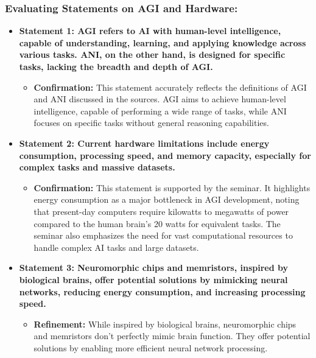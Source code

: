 \documentclass[
]{article}
\author{}
\date{}
\begin{document}
\subsubsection{Evaluating Statements on AGI and
Hardware:}\label{evaluating-statements-on-agi-and-hardware}

\begin{itemize}
\item
  \textbf{Statement 1: AGI refers to AI with human-level intelligence,
  capable of understanding, learning, and applying knowledge across
  various tasks. ANI, on the other hand, is designed for specific tasks,
  lacking the breadth and depth of AGI.}

  \begin{itemize}
  
  \item
    \textbf{Confirmation:} This statement accurately reflects the
    definitions of AGI and ANI discussed in the sources. AGI aims to
    achieve human-level intelligence, capable of performing a wide range
    of tasks, while ANI focuses on specific tasks without general
    reasoning capabilities.
  \end{itemize}
\item
  \textbf{Statement 2: Current hardware limitations include energy
  consumption, processing speed, and memory capacity, especially for
  complex tasks and massive datasets.}

  \begin{itemize}
  
  \item
    \textbf{Confirmation:} This statement is supported by the seminar.
    It highlights energy consumption as a major bottleneck in AGI
    development, noting that present-day computers require kilowatts to
    megawatts of power compared to the human brain's 20 watts for
    equivalent tasks. The seminar also emphasizes the need for vast
    computational resources to handle complex AI tasks and large
    datasets.
  \end{itemize}
\item
  \textbf{Statement 3: Neuromorphic chips and memristors, inspired by
  biological brains, offer potential solutions by mimicking neural
  networks, reducing energy consumption, and increasing processing
  speed.}

  \begin{itemize}
  
  \item
    \textbf{Refinement:} While inspired by biological brains,
    neuromorphic chips and memristors don't perfectly mimic brain
    function. They offer potential solutions by enabling more efficient
    neural network processing.


\end{itemize}
\end{itemize}
\end{document}

